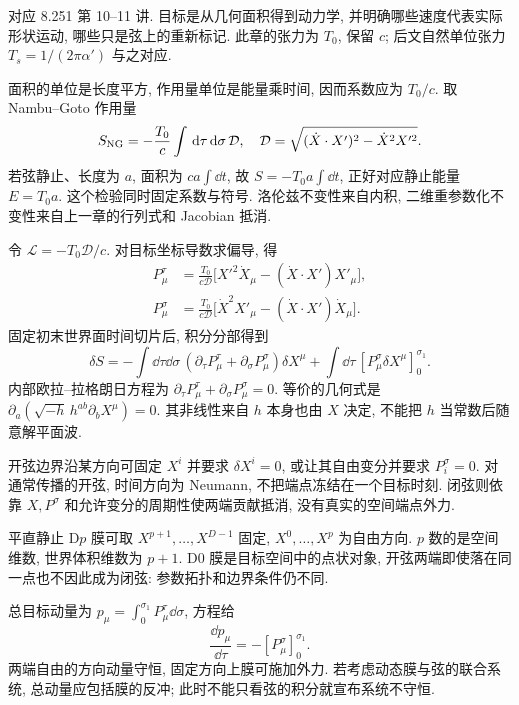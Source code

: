 \label{ch:basic-NG}
对应 8.251 第 10--11 讲. 目标是从几何面积得到动力学, 并明确哪些速度代表实际形状运动, 哪些只是弦上的重新标记. 此章的张力为 $T_0$, 保留 $c$; 后文自然单位张力 $T_s=1/(2\pi\alpha')$ 与之对应.

面积的单位是长度平方, 作用量单位是能量乘时间, 因而系数应为 $T_0/c$. 取 Nambu--Goto 作用量
\[
 S_{\rm NG}=-\frac{T_0}{c}\int\,\mathrm d\tau\,\mathrm d\sigma\,\mathcal D,
 \quad\mathcal D=\sqrt{(\dot X\cdot X')^2-\dot X^2X'^2}.
\]
若弦静止、长度为 $a$, 面积为 $ca\int\dd t$, 故 $S=-T_0a\int\dd t$, 正好对应静止能量 $E=T_0a$. 这个检验同时固定系数与符号. 洛伦兹不变性来自内积, 二维重参数化不变性来自上一章的行列式和 Jacobian 抵消.

令 $\mathcal L=-T_0\mathcal D/c$. 对目标坐标导数求偏导, 得
\begin{align*}
 P_\mu^\tau&=\frac{T_0}{c\mathcal D}
 \big[X'^2\dot X_\mu-(\dot X\cdot X')X'_\mu\big],\\
 P_\mu^\sigma&=\frac{T_0}{c\mathcal D}
 \big[\dot X^2X'_\mu-(\dot X\cdot X')\dot X_\mu\big].
\end{align*}
固定初末世界面时间切片后, 积分分部得到
\[
 \delta S=-\int\dd\tau\dd\sigma\,
 (\partial_\tau P_\mu^\tau+\partial_\sigma P_\mu^\sigma)\delta X^\mu
 +\int\dd\tau\,[P_\mu^\sigma\delta X^\mu]_{0}^{\sigma_1}.
\]
内部欧拉--拉格朗日方程为 $\partial_\tau P_\mu^\tau+\partial_\sigma P_\mu^\sigma=0$. 等价的几何式是 $\partial_a(\sqrt{-h}\,h^{ab}\partial_bX^\mu)=0$. 其非线性来自 $h$ 本身也由 $X$ 决定, 不能把 $h$ 当常数后随意解平面波.

开弦边界沿某方向可固定 $X^i$ 并要求 $\delta X^i=0$, 或让其自由变分并要求 $P_i^\sigma=0$. 对通常传播的开弦, 时间方向为 Neumann, 不把端点冻结在一个目标时刻. 闭弦则依靠 $X,P^\sigma$ 和允许变分的周期性使两端贡献抵消, 没有真实的空间端点外力.

平直静止 D$p$ 膜可取 $X^{p+1},\ldots,X^{D-1}$ 固定, $X^0,\ldots,X^p$ 为自由方向. $p$ 数的是空间维数, 世界体积维数为 $p+1$. D0 膜是目标空间中的点状对象, 开弦两端即使落在同一点也不因此成为闭弦: 参数拓扑和边界条件仍不同.

总目标动量为 $p_\mu=\int_0^{\sigma_1}P_\mu^\tau\dd\sigma$, 方程给
\[
 \frac{\dd p_\mu}{\dd\tau}=-[P_\mu^\sigma]_{0}^{\sigma_1}.
\]
两端自由的方向动量守恒, 固定方向上膜可施加外力. 若考虑动态膜与弦的联合系统, 总动量应包括膜的反冲; 此时不能只看弦的积分就宣布系统不守恒.

